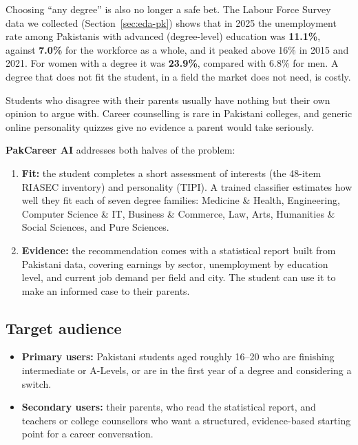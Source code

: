 \documentclass[11pt,a4paper]{article}
\begin{document}
Choosing ``any degree'' is also no longer a safe bet. The Labour Force Survey data we collected
(Section~\ref{sec:eda-pk}) shows that in 2025 the unemployment rate among Pakistanis with advanced
(degree-level) education was \textbf{11.1\%}, against \textbf{7.0\%} for the workforce as a whole,
and it peaked above 16\% in 2015 and 2021. For women with a degree it was \textbf{23.9\%}, compared
with 6.8\% for men. A degree that does not fit the student, in a field the market does not need,
is costly.

Students who disagree with their parents usually have nothing but their own opinion to argue
with. Career counselling is rare in Pakistani colleges, and generic online personality quizzes
give no evidence a parent would take seriously.

\textbf{PakCareer AI} addresses both halves of the problem:
\begin{enumerate}
\item \textbf{Fit:} the student completes a short assessment of interests (the 48-item RIASEC
      inventory) and personality (TIPI). A trained classifier estimates how well they fit each of
      seven degree families: Medicine \& Health, Engineering, Computer Science \& IT,
      Business \& Commerce, Law, Arts, Humanities \& Social Sciences, and Pure Sciences.
\item \textbf{Evidence:} the recommendation comes with a statistical report built from Pakistani
      data, covering earnings by sector, unemployment by education level, and current job demand
      per field and city. The student can use it to make an informed case to their parents.
\end{enumerate}

\subsection{Target audience}
\begin{itemize}
\item \textbf{Primary users:} Pakistani students aged roughly 16--20 who are finishing
      intermediate or A-Levels, or are in the first year of a degree and considering a switch.
\item \textbf{Secondary users:} their parents, who read the statistical report, and teachers or
      college counsellors who want a structured, evidence-based starting point for a career
      conversation.
\end{itemize}
\end{document}
